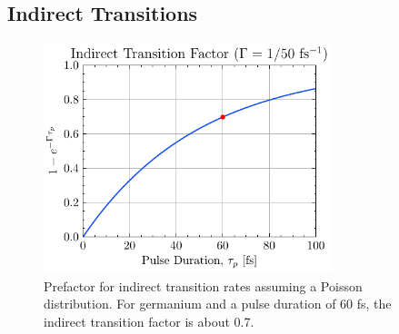 \subsection{Indirect Transitions}

\begin{figure}
	\centering
	\includegraphics[width=0.75\textwidth]{figures/chap4/Indirect_transition_factor.pdf}
	\caption{Prefactor for indirect transition rates assuming a Poisson distribution. For germanium and a pulse duration of 60 fs, the indirect transition factor is about 0.7.}
	\label{fig:Indirect_transition_factor}
\end{figure}

